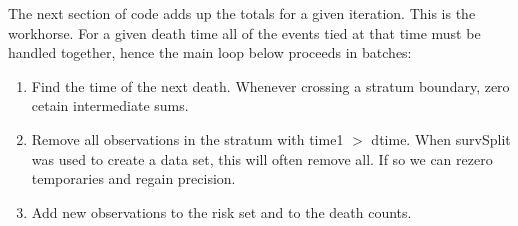 \documentclass{article}
\begin{document}
The next section of code adds up the totals for a given iteration.
This is the workhorse.
For a given death time all of the events tied at
that time must be handled together, hence the main loop below proceeds in
batches:
\begin{enumerate}
  \item Find the time of the next death.  Whenever crossing a stratum
    boundary, zero cetain intermediate sums.
  \item Remove all observations in the stratum with time1 $>$ dtime.
    When survSplit was used to create a data set, this will often remove all.
    If so we can rezero temporaries and regain precision.
  \item Add new observations to the risk set and to the death counts.
\end{enumerate}
\end{document}
